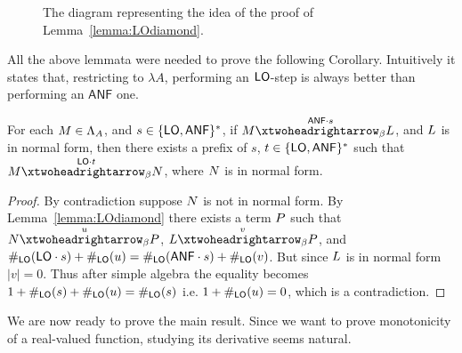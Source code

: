 \begin{figure}
	
	\caption{The diagram representing the idea of the proof of Lemma~\ref{lemma:LOdiamond}.}
	\label{figure:diagram}
\end{figure}
All the above lemmata were needed to prove the following Corollary. Intuitively it states that, restricting to $\lambda A$, performing an $\textsf{LO}$-step is always better than performing an $\textsf{ANF}$ one.
\begin{corollary}\label{corollary:nfstring}
	For each $M\in\Lambda_A$, and $s\in\{\textsf{LO},\mathsf{ANF}\}^*$, if $\termone\redbetared{\mathsf{ANF}\cdot s}\termthree$, and $L$ is in normal form, then there exists a prefix of $s$, $t\in\{\textsf{LO},\mathsf{ANF}\}^*$ such that $\termone\redbetared{\pslo\cdot t}\termtwo$, where $N$ is in normal form.
\end{corollary}
\begin{proof}
	By contradiction suppose $N$ is not in normal form. By Lemma~\ref{lemma:LOdiamond} there exists a term $P$ such that $\termtwo\redbetared{u}\termfour$, $\termthree\redbetared{v}\termfour$, and $\#_{\textsf{LO}}(\textsf{LO}\cdot s)+\#_{\textsf{LO}}(u)=\#_{\textsf{LO}}(\mathsf{ANF}\cdot s)+\#_{\textsf{LO}}(v)$. But since $L$ is in normal form $|v|=0$. Thus after simple algebra the equality becomes $1+ \#_{\textsf{LO}}(s)+\#_{\textsf{LO}}(u)=\#_{\textsf{LO}}(s)$ i.e. $1+\#_{\textsf{LO}}(u)=0$, which is a contradiction.
\end{proof}
We are now ready to prove the main result. Since we want to prove monotonicity of a real-valued function, studying its derivative seems natural.

